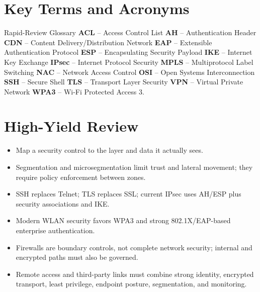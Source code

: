\documentclass[10pt,letterpaper]{article}
\begin{document}
\section{Key Terms and Acronyms}
\begin{summarybox}{Rapid-Review Glossary}
\textbf{ACL} -- Access Control List \quad
\textbf{AH} -- Authentication Header \quad
\textbf{CDN} -- Content Delivery/Distribution Network \quad
\textbf{EAP} -- Extensible Authentication Protocol \quad
\textbf{ESP} -- Encapsulating Security Payload \quad
\textbf{IKE} -- Internet Key Exchange \quad
\textbf{IPsec} -- Internet Protocol Security \quad
\textbf{MPLS} -- Multiprotocol Label Switching \quad
\textbf{NAC} -- Network Access Control \quad
\textbf{OSI} -- Open Systems Interconnection \quad
\textbf{SSH} -- Secure Shell \quad
\textbf{TLS} -- Transport Layer Security \quad
\textbf{VPN} -- Virtual Private Network \quad
\textbf{WPA3} -- Wi-Fi Protected Access 3.
\end{summarybox}

\section{High-Yield Review}
\begin{itemize}
\item Map a security control to the layer and data it actually sees.
\item Segmentation and microsegmentation limit trust and lateral movement; they require policy enforcement between zones.
\item SSH replaces Telnet; TLS replaces SSL; current IPsec uses AH/ESP plus security associations and IKE.
\item Modern WLAN security favors WPA3 and strong 802.1X/EAP-based enterprise authentication.
\item Firewalls are boundary controls, not complete network security; internal and encrypted paths must also be governed.
\item Remote access and third-party links must combine strong identity, encrypted transport, least privilege, endpoint posture, segmentation, and monitoring.
\end{itemize}
\end{document}
